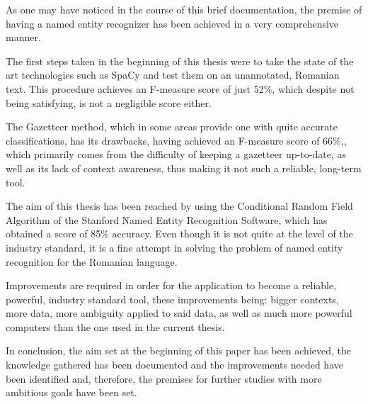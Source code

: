 \documentclass[12pt,a4paper]{article}
\begin{document}
\qquad As one may have noticed in the course of this brief documentation, the premise of having a named entity recognizer has been achieved in a very comprehensive manner.

\qquad The first steps taken in the beginning of this thesis were to take the state of the art technologies such as SpaCy and test them on an unannotated, Romanian text. This procedure achieves an F-measure score of just 52$\%$, which despite not being satisfying, is not a negligible score either.

\qquad The Gazetteer method, which in some areas provide one with quite accurate classifications,  has its drawbacks, having achieved an F-measure score of 66$\%$,, which primarily comes from the difficulty of keeping a gazetteer up-to-date, as well as its lack of context awareness, thus making it not such a reliable, long-term tool.

\qquad The aim of this thesis has been reached by using the Conditional Random Field Algorithm of the Stanford Named Entity Recognition Software, which has obtained a score of 85$\%$ accuracy. Even though it is not quite at the level of the industry standard, it is a fine attempt in solving the problem of named entity recognition for the Romanian language.

\qquad Improvements are required in order for the application to become a reliable, powerful, industry standard tool, these improvements being: bigger contexts, more data, more ambiguity applied to said data, as well as much more powerful computers than the one used in the current thesis. 

\qquad In conclusion, the aim set at the beginning of this paper has been achieved, the knowledge gathered has been documented and the improvements needed have been identified and, therefore, the premises for further studies with more ambitious goals have been set.

\newpage
\end{document}
